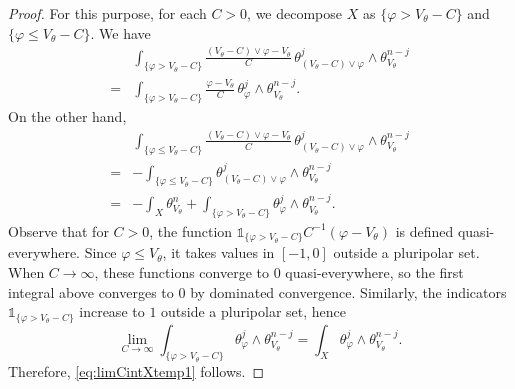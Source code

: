 \begin{proof}
    For this purpose, for each $C>0$, we decompose $X$ as $\{\varphi> V_{\theta}-C\}$ and $\{\varphi\leq V_{\theta}-C\}$.
    We have
    \[
    \begin{aligned}
    &\int_{\{\varphi> V_{\theta}-C\}} \frac{(V_{\theta}-C)\lor\varphi -V_{\theta}}{C} \,\theta_{(V_{\theta}-C)\lor \varphi}^j\wedge \theta_{V_{\theta}}^{n-j}\\
    =& \int_{\{\varphi> V_{\theta}-C\}} \frac{\varphi -V_{\theta}}{C} \,\theta_{\varphi}^j\wedge \theta_{V_{\theta}}^{n-j}.
    \end{aligned}
    \]
    On the other hand,
    \[
    \begin{aligned}
    &\int_{\{\varphi\leq V_{\theta}-C\}} \frac{(V_{\theta}-C)\lor\varphi -V_{\theta}}{C} \,\theta_{(V_{\theta}-C)\lor \varphi}^j\wedge \theta_{V_{\theta}}^{n-j}\\
    =& -\int_{\{\varphi\leq V_{\theta}-C\}} \theta_{(V_{\theta}-C)\lor\varphi}^j\wedge \theta_{V_{\theta}}^{n-j}\\
    =& -\int_X \theta_{V_{\theta}}^n+\int_{\{\varphi> V_{\theta}-C\}} \theta_{\varphi}^j\wedge \theta_{V_{\theta}}^{n-j}.
    \end{aligned}
    \]
    Observe that for $C>0$, the function $\mathds{1}_{\{\varphi>V_{\theta}-C\}}C^{-1}(\varphi-V_{\theta})$ is defined quasi-everywhere. Since $\varphi\leq V_\theta$, it takes values in $[-1,0]$ outside a pluripolar set.
    When $C\to \infty$, these functions converge to $0$ quasi-everywhere, so the first integral above converges to $0$ by dominated convergence. Similarly, the indicators $\mathds{1}_{\{\varphi>V_\theta-C\}}$ increase to $1$ outside a pluripolar set, hence
    \[
        \lim_{C\to\infty}\int_{\{\varphi>V_{\theta}-C\}} \theta_{\varphi}^j\wedge \theta_{V_{\theta}}^{n-j} = \int_X \theta_{\varphi}^j\wedge \theta_{V_{\theta}}^{n-j}.
    \]
    Therefore, \eqref{eq:limCintXtemp1} follows.
\end{proof}
